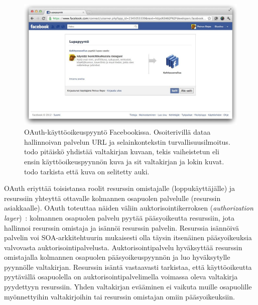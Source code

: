 \documentclass[finnish,gradu]{tktltiki}
\begin{document}
  \begin{figure}
    \centering
    \includegraphics[width=1.0\textwidth]{images/facebook_oauth_lupapyynto.jpg}
    \caption{OAuth-käyttöoikeuspyyntö Facebookissa. Osoiterivillä dataa hallinnoivan palvelun URL ja selainkontekstin turvallisuusilmoitus. todo pitäiskö yhdistää valtakirjan kuvaan, tekis vaiheistetun eli ensin käyttöoikeuspyynnön kuva ja sit valtakirjan ja lokin kuvat. todo tarkista että kuva on selitetty auki.}
    \label{fig:facebook_oauth_lupapyynto}
  \end{figure}

  OAuth eriyttää toisistansa roolit resurssin omistajalle (loppukäyttäjälle) ja resurssiin yhteyttä ottavalle kolmannen osapuolen palvelulle (resurssin asiakkaalle). OAuth toteuttaa näiden väliin auktorisointikerroksen (\emph{authorization layer})~\cite{ietf_oauth2}: kolmannen osapuolen palvelu pyytää pääsyoikeutta resurssiin, jota hallinnoi resurssin omistaja ja isännöi resurssin palvelin. Resurssia isännöivä palvelin voi SOA-arkkitehtuurin mukaisesti olla täysin itsenäinen pääsyoikeuksia valvovasta auktorisointipalvelusta. Auktorisointipalvelu hyväksyttää resurssin omistajalla kolmannen osapuolen pääsyoikeuspyynnön ja luo hyväksytylle pyynnölle valtakirjan. Resurssin isäntä vastaavasti tarkistaa, että käyttöoikeutta pyytävällä osapuolella on auktorisointipalvelimella voimassa oleva valtakirja pyydettyyn resurssiin. Yhden valtakirjan evääminen ei vaikuta muille osapuolille myönnettyihin valtakirjoihin tai resurssin omistajan omiin pääsyoikeuksiin.
\end{document}
